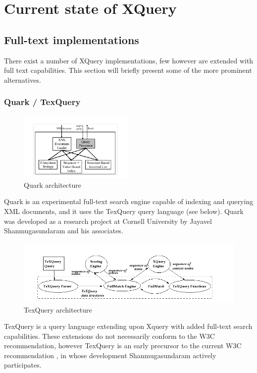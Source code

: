 \section{Current state of XQuery}
\subsection{Full-text implementations}
There exist a number of XQuery implementations, few however are extended with 
full text capabilities. This section will briefly present some of the more 
prominent alternatives.
\subsubsection{Quark / TexQuery}
\begin{figure}[!h]
  \centering
    \includegraphics[width=0.5\textwidth]{img/quark_architecture.png}
  \caption{Quark architecture}
\end{figure}
Quark is an experimental full-text search engine capable of indexing and
querying XML documents, and it uses the TexQuery query language (see below). 
Quark was developed as a research project at Cornell University by Jayavel 
Shanmugasundaram and his associates.

\begin{figure}[!h]
  \centering
    \includegraphics[width=1\textwidth]{img/texquery_architecture.png}
  \caption{TexQuery architecture}
\end{figure}
TexQuery is a query language extending upon Xquery with added full-text search 
capabilities. These extensions do not necessarily conform to the W3C
recommendation, however TexQuery is an early precursor to the current W3C 
recommendation \cite{TEXQ00}, in whose development Shanmugasundaram actively 
participates.


